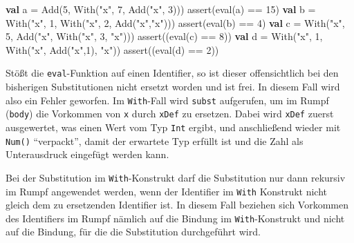 \documentclass[]{article}
\newenvironment{Shaded}{}{}
\newcommand{\DecValTok}[1]{\textcolor[rgb]{0.25,0.63,0.44}{#1}}
\newcommand{\FunctionTok}[1]{\textcolor[rgb]{0.02,0.16,0.49}{#1}}
\newcommand{\KeywordTok}[1]{\textcolor[rgb]{0.00,0.44,0.13}{\textbf{#1}}}
\newcommand{\NormalTok}[1]{#1}
\newcommand{\StringTok}[1]{\textcolor[rgb]{0.25,0.44,0.63}{#1}}
\begin{document}
\begin{Shaded}
\begin{Highlighting}[]
\KeywordTok{val}\NormalTok{ a = }\FunctionTok{Add}\NormalTok{(}\DecValTok{5}\NormalTok{, }\FunctionTok{With}\NormalTok{(}\StringTok{"x"}\NormalTok{, }\DecValTok{7}\NormalTok{, }\FunctionTok{Add}\NormalTok{(}\StringTok{"x"}\NormalTok{, }\DecValTok{3}\NormalTok{)))}
\FunctionTok{assert}\NormalTok{(}\FunctionTok{eval}\NormalTok{(a) == }\DecValTok{15}\NormalTok{)}
\KeywordTok{val}\NormalTok{ b = }\FunctionTok{With}\NormalTok{(}\StringTok{"x"}\NormalTok{, }\DecValTok{1}\NormalTok{, }\FunctionTok{With}\NormalTok{(}\StringTok{"x"}\NormalTok{, }\DecValTok{2}\NormalTok{, }\FunctionTok{Add}\NormalTok{(}\StringTok{"x"}\NormalTok{,}\StringTok{"x"}\NormalTok{)))}
\FunctionTok{assert}\NormalTok{(}\FunctionTok{eval}\NormalTok{(b) == }\DecValTok{4}\NormalTok{)}
\KeywordTok{val}\NormalTok{ c = }\FunctionTok{With}\NormalTok{(}\StringTok{"x"}\NormalTok{, }\DecValTok{5}\NormalTok{, }\FunctionTok{Add}\NormalTok{(}\StringTok{"x"}\NormalTok{, }\FunctionTok{With}\NormalTok{(}\StringTok{"x"}\NormalTok{, }\DecValTok{3}\NormalTok{, }\StringTok{"x"}\NormalTok{)))}
\FunctionTok{assert}\NormalTok{((}\FunctionTok{eval}\NormalTok{(c) == }\DecValTok{8}\NormalTok{))}
\KeywordTok{val}\NormalTok{ d = }\FunctionTok{With}\NormalTok{(}\StringTok{"x"}\NormalTok{, }\DecValTok{1}\NormalTok{, }\FunctionTok{With}\NormalTok{(}\StringTok{"x"}\NormalTok{, }\FunctionTok{Add}\NormalTok{(}\StringTok{"x"}\NormalTok{,}\DecValTok{1}\NormalTok{), }\StringTok{"x"}\NormalTok{))}
\FunctionTok{assert}\NormalTok{((}\FunctionTok{eval}\NormalTok{(d) == }\DecValTok{2}\NormalTok{))}
\end{Highlighting}
\end{Shaded}

Stößt die \texttt{eval}-Funktion auf einen Identifier, so ist dieser
offensichtlich bei den bisherigen Substitutionen nicht ersetzt worden
und ist frei. In diesem Fall wird also ein Fehler geworfen. Im
\texttt{With}-Fall wird \texttt{subst} aufgerufen, um im Rumpf
(\texttt{body}) die Vorkommen von \texttt{x} durch \texttt{xDef} zu
ersetzen. Dabei wird \texttt{xDef} zuerst ausgewertet, was einen Wert
vom Typ \texttt{Int} ergibt, und anschließend wieder mit \texttt{Num()}
``verpackt'', damit der erwartete Typ erfüllt ist und die Zahl als
Unterausdruck eingefügt werden kann.

Bei der Substitution im \texttt{With}-Konstrukt darf die Substitution
nur dann rekursiv im Rumpf angewendet werden, wenn der Identifier im
\texttt{With} Konstrukt nicht gleich dem zu ersetzenden Identifier ist.
In diesem Fall beziehen sich Vorkommen des Identifiers im Rumpf nämlich
auf die Bindung im \texttt{With}-Konstrukt und nicht auf die Bindung,
für die die Substitution durchgeführt wird.
\end{document}
